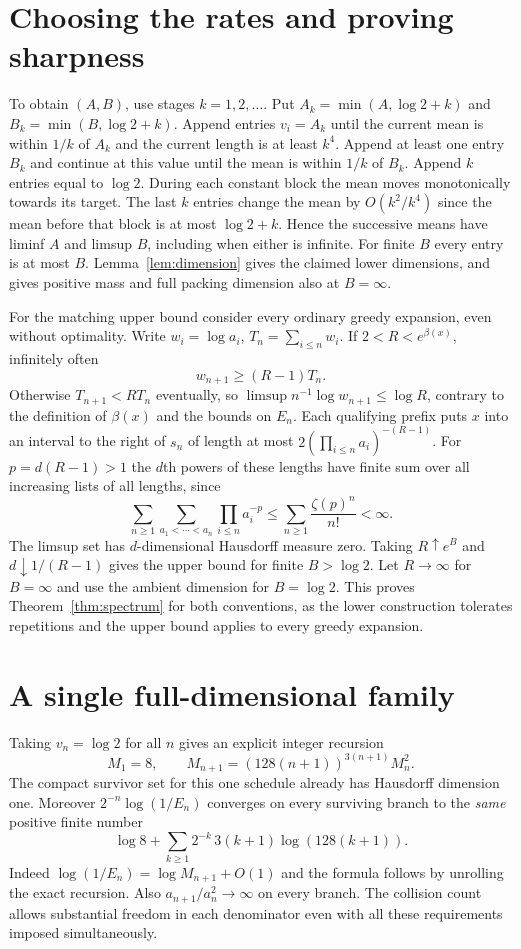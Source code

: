 \documentclass[11pt]{article}
\begin{document}
\section{Choosing the rates and proving sharpness}
To obtain $(A,B)$, use stages $k=1,2,\dots$. Put $A_k=\min(A,\log2+k)$ and $B_k=\min(B,\log2+k)$. Append entries $v_i=A_k$ until the current mean is within $1/k$ of $A_k$ and the current length is at least $k^4$. Append at least one entry $B_k$ and continue at this value until the mean is within $1/k$ of $B_k$. Append $k$ entries equal to $\log2$. During each constant block the mean moves monotonically towards its target. The last $k$ entries change the mean by $O(k^2/k^4)$ since the mean before that block is at most $\log2+k$. Hence the successive means have liminf $A$ and limsup $B$, including when either is infinite. For finite $B$ every entry is at most $B$. Lemma~\ref{lem:dimension} gives the claimed lower dimensions, and gives positive mass and full packing dimension also at $B=\infty$.

For the matching upper bound consider every ordinary greedy expansion, even without optimality. Write $w_i=\log a_i$, $T_n=\sum_{i\le n}w_i$. If $2<R<e^{\beta(x)}$, infinitely often
\[
 w_{n+1}\ge(R-1)T_n.
\]
Otherwise $T_{n+1}<RT_n$ eventually, so $\limsup n^{-1}\log w_{n+1}\le\log R$, contrary to the definition of $\beta(x)$ and the bounds on $E_n$. Each qualifying prefix puts $x$ into an interval to the right of $s_n$ of length at most $2(\prod_{i\le n}a_i)^{-(R-1)}$. For $p=d(R-1)>1$ the $d$th powers of these lengths have finite sum over all increasing lists of all lengths, since
\[
 \sum_{n\ge1}\sum_{a_1<\cdots<a_n}\prod_{i\le n}a_i^{-p}
 \le\sum_{n\ge1}\frac{\zeta(p)^n}{n!}<\infty.
\]
The limsup set has $d$-dimensional Hausdorff measure zero. Taking $R\uparrow e^B$ and $d\downarrow1/(R-1)$ gives the upper bound for finite $B>\log2$. Let $R\to\infty$ for $B=\infty$ and use the ambient dimension for $B=\log2$. This proves Theorem~\ref{thm:spectrum} for both conventions, as the lower construction tolerates repetitions and the upper bound applies to every greedy expansion.

\section{A single full-dimensional family}
Taking $v_n=\log2$ for all $n$ gives an explicit integer recursion
\[
 M_1=8,\qquad M_{n+1}=(128(n+1))^{3(n+1)}M_n^2.
\]
The compact survivor set for this one schedule already has Hausdorff dimension one. Moreover $2^{-n}\log(1/E_n)$ converges on every surviving branch to the \emph{same} positive finite number
\[
 \log 8+\sum_{k\ge1}2^{-k}\,3(k+1)\log(128(k+1)).
\]
Indeed $\log(1/E_n)=\log M_{n+1}+O(1)$ and the formula follows by unrolling the exact recursion. Also $a_{n+1}/a_n^2\to\infty$ on every branch. The collision count allows substantial freedom in each denominator even with all these requirements imposed simultaneously.
\end{document}

